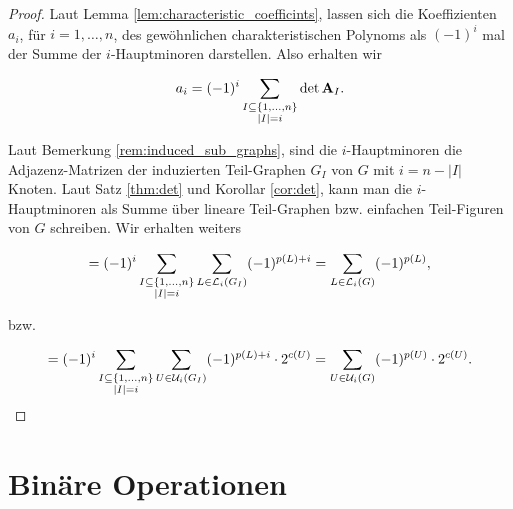             \begin{proof}
    
                Laut Lemma \ref{lem:characteristic_coefficints}, lassen sich die Koeffizienten $a_i$, für $i = 1, \dots, n$, des gewöhnlichen charakteristischen Polynoms als $(-1)^i$ mal der Summe der $i$-Hauptminoren darstellen.
                Also erhalten wir
    
                \begin{align*}
                    a_i
                    =
                    (-1)^i
                    \sum_{\substack{I \subseteq {\left \{ 1, \dots, n \right \}} \\ |I| = i}}
                        \det \mathbf A_I.
                \end{align*}
    
                Laut Bemerkung \ref{rem:induced_sub_graphs}, sind die $i$-Hauptminoren die Adjazenz-Matrizen der induzierten Teil-Graphen $G_I$ von $G$ mit $i = n - |I|$ Knoten.
                Laut Satz \ref{thm:det} und Korollar \ref{cor:det}, kann man die $i$-Hauptminoren als Summe über lineare Teil-Graphen bzw. einfachen Teil-Figuren von $G$ schreiben.
                Wir erhalten weiters
    
                \begin{align*}
                    =
                    (-1)^i
                    \sum_{\substack{I \subseteq {\left \{ 1, \dots, n \right \}} \\ |I| = i}}
                        \sum_{L \in \mathcal L_i(G_I)}
                            (-1)^{p(L) + i}
                    =
                    \sum_{L \in \mathcal L_i(G)} (-1)^{p(L)},
                \end{align*}
    
                bzw.
    
                \begin{align*}
                    =
                    (-1)^i
                    \sum_{\substack{I \subseteq {\left \{ 1, \dots, n \right \}} \\ |I| = i}}
                        \sum_{U \in \mathcal U_i(G_I)}
                            (-1)^{p(L) + i} \cdot 2^{c(U)}
                    =
                    \sum_{U \in \mathcal U_i(G)} (-1)^{p(U)} \cdot 2^{c(U)}.
                \end{align*}
    
            \end{proof}    

    \section{Binäre Operationen}

